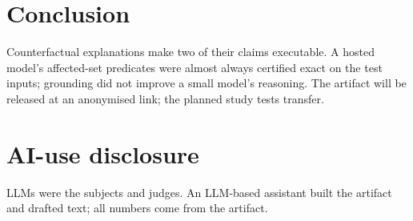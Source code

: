 \section{Conclusion}\label{sec:conclusion}
Counterfactual explanations make two of their claims executable. A hosted model's affected-set predicates were almost
always certified exact on the test inputs; grounding did not improve a small
model's reasoning. The artifact will be released at an anonymised link; the planned study tests transfer.

\section*{AI-use disclosure}
LLMs were the subjects and judges. An LLM-based assistant built the artifact and drafted text; all numbers come from the artifact.
